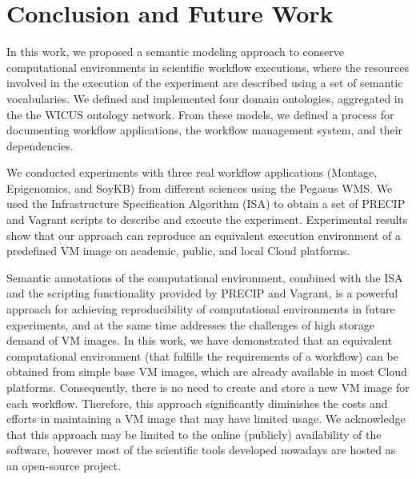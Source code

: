 \section{Conclusion and Future Work}
\label{sec:conclusion}

In this work, we proposed a semantic modeling approach to conserve 
computational environments in scientific workflow executions, where  
the resources involved in the execution of the experiment are described 
using a set of semantic vocabularies. We defined and implemented four 
domain ontologies, aggregated in the the WICUS ontology network. From 
these models, we defined a process for documenting workflow applications, 
the workflow management system, and their dependencies.

We conducted experiments with three real workflow applications (Montage, 
Epigenomics, and SoyKB) from different sciences using the Pegasus WMS. 
We used the Infrastructure Specification Algorithm (ISA) to obtain a set of 
PRECIP and Vagrant scripts to describe and execute the experiment. 
Experimental results show that our approach can reproduce an equivalent 
execution environment of a predefined VM image on academic, public, and 
local Cloud platforms.

Semantic annotations of the computational environment, combined with the 
ISA and the scripting functionality provided by PRECIP and Vagrant, is a 
powerful approach for achieving reproducibility of computational environments 
in future experiments, and at the same time addresses the challenges of high 
storage demand of VM images. In this work, we have demonstrated that
an equivalent computational environment (that fulfills the requirements of a
workflow) can be obtained from simple base VM images, which are already 
available in most Cloud platforms. Consequently, there is no need to create 
and store a new VM image for each workflow. Therefore, this approach 
significantly diminishes the costs and efforts in maintaining a VM image that 
may have limited usage. We acknowledge that this approach may be limited 
to the online (publicly) availability of the software, however most of the scientific
tools developed nowadays are hosted as an open-source project.


